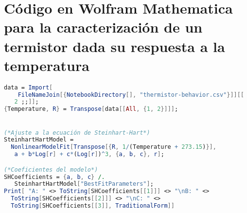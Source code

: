 \chapter{Código en Wolfram Mathematica para la caracterización de un termistor dada su respuesta a la temperatura}
\label{ch:steinhart-code}

\begin{lstlisting}[language={Mathematica}]
data = Import[
    FileNameJoin[{NotebookDirectory[], "thermistor-behavior.csv"}]][[
   2 ;;]];
{Temperature, R} = Transpose[data[[All, {1, 2}]]];


(*Ajuste a la ecuación de Steinhart-Hart*)
SteinhartHartModel = 
  NonlinearModelFit[Transpose[{R, 1/(Temperature + 273.15)}], 
   a + b*Log[r] + c*(Log[r])^3, {a, b, c}, r];

(*Coeficientes del modelo*)
SHCoefficients = {a, b, c} /. 
   SteinhartHartModel["BestFitParameters"];
Print[ "A: " <> ToString[SHCoefficients[[1]]] <> "\nB: " <> 
  ToString[SHCoefficients[[2]]] <> "\nC: " <> 
  ToString[SHCoefficients[[3]], TraditionalForm]]
\end{lstlisting}
